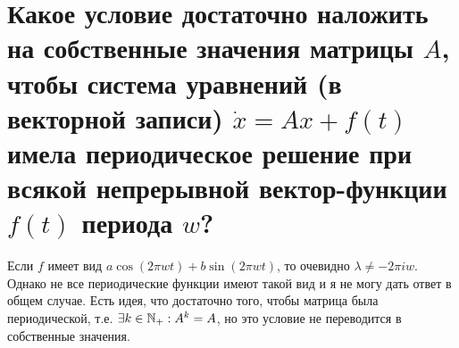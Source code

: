 
\section{Какое условие достаточно наложить на собственные значения матрицы $A$, чтобы система уравнений (в векторной записи) $\dot{x}=Ax+f(t)$ имела периодическое решение при всякой непрерывной вектор-функции $f(t)$ периода $w$?}

Если \(f\) имеет вид \(a \cos(2\pi wt) + b\sin(2\pi wt)\), то очевидно \(\lambda\neq - 2\pi iw\). Однако не все периодические функции имеют такой вид и я не могу дать ответ в общем случае. Есть идея, что достаточно того, чтобы матрица была периодической, т.е. \(\exists k \in \mathbb{N}_{ +} : A^{k} = A\), но это условие не переводится в собственные значения.

